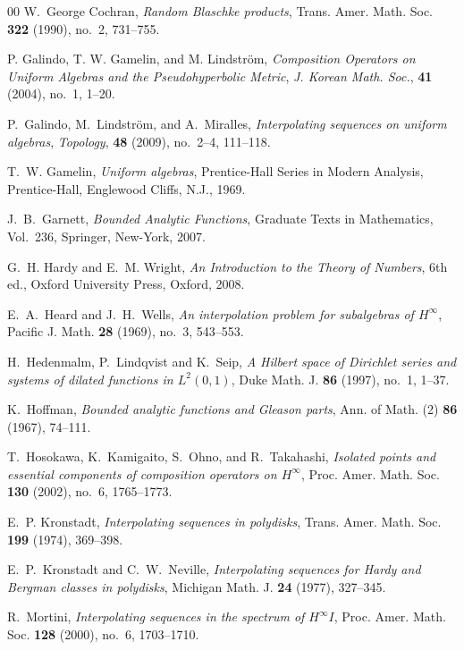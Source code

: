 \documentclass[preprint,12pt,number]{elsarticle}
\begin{document}
\begin{thebibliography}{00}
W.~George Cochran,
\textit{Random Blaschke products},
Trans. Amer. Math. Soc. \textbf{322} (1990), no.~2, 731--755.

P. Galindo, T. W. Gamelin, and M. Lindström,
\textit{Composition Operators on Uniform Algebras and the Pseudohyperbolic Metric},
\textit{J. Korean Math. Soc.},
\textbf{41} (2004), no.~1, 1--20.

P.~Galindo, M.~Lindström, and A.~Miralles,
\textit{Interpolating sequences on uniform algebras},
\textit{Topology},
\textbf{48} (2009), no.~2--4, 111--118.

T.~W. Gamelin, \textit{Uniform algebras}, Prentice-Hall Series in Modern Analysis, Prentice-Hall, Englewood Cliffs, N.J., 1969.

J.~B.~Garnett,
\textit{Bounded Analytic Functions},
Graduate Texts in Mathematics, Vol.~236,
Springer, New-York, 2007.

G.~H. Hardy and E.~M. Wright,
\emph{An Introduction to the Theory of Numbers},
6th ed.,
Oxford University Press,
Oxford, 2008.

E.~A.~Heard and J.~H.~Wells,
\textit{An interpolation problem for subalgebras of $H^\infty$},
Pacific J. Math. \textbf{28} (1969), no.~3, 543--553.

H.~Hedenmalm, P.~Lindqvist and K.~Seip,
\textit{A Hilbert space of Dirichlet series and systems of dilated functions in $L^2(0,1)$},
Duke Math. J. \textbf{86} (1997), no.~1, 1--37.

K.~Hoffman,
\emph{Bounded analytic functions and Gleason parts},
Ann. of Math. (2) \textbf{86} (1967), 74--111.

T.~Hosokawa, K.~Kamigaito, S.~Ohno, and R.~Takahashi,
\textit{Isolated points and essential components of composition operators on $H^\infty$},
Proc. Amer. Math. Soc. \textbf{130} (2002), no.~6, 1765--1773.

E.~P. Kronstadt, \emph{Interpolating sequences in polydisks}, Trans. Amer. Math. Soc. \textbf{199} (1974), 369--398.

E.~P.~Kronstadt and C.~W.~Neville,
\textit{Interpolating sequences for Hardy and Bergman classes in polydisks},
Michigan Math. J. \textbf{24} (1977), 327--345.

R.~Mortini,
\textit{Interpolating sequences in the spectrum of $H^{\infty} I$},
Proc. Amer. Math. Soc. \textbf{128} (2000), no.~6, 1703--1710.


\end{thebibliography}
\end{document}
